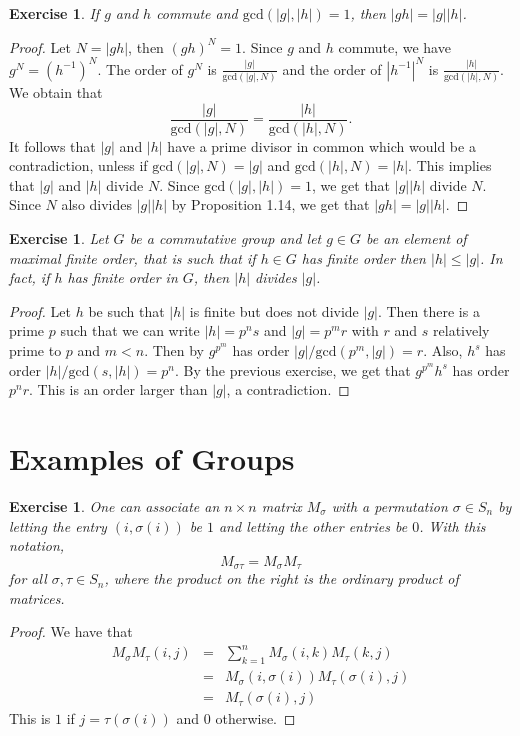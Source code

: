 \documentclass[a4paper, 11pt]{book}
\theoremstyle{plain}
\newtheorem{exercise}[theorem]{Exercise}
\theoremstyle{plain}
\begin{document}
\begin{exercise}
If $g$ and $h$ commute and $\text{gcd}(|g|,|h|)=1$, then $|gh|=|g||h|$.
\end{exercise}
\begin{proof}
Let $N=|gh|$, then $(gh)^N=1$. Since $g$ and $h$ commute, we have $g^N = (h^{-1})^N$. The order of $g^N$ is $\frac{|g|}{\text{gcd}(|g|,N)}$ and the order of $|h^{-1}|^N$ is $\frac{|h|}{\text{gcd}(|h|,N)}$. We obtain that
$$\frac{|g|}{\text{gcd}(|g|,N)}=\frac{|h|}{\text{gcd}(|h|,N)}.$$
It follows that $|g|$ and $|h|$ have a prime divisor in common which would  be a contradiction, unless if $\text{gcd}(|g|,N) = |g|$ and $\text{gcd}(|h|,N) = |h|$. This implies that $|g|$ and $|h|$ divide $N$. Since $\text{gcd}(|g|,|h|)=1$, we get that $|g||h|$ divide $N$. Since $N$ also divides $|g||h|$ by Proposition 1.14, we get that $|gh|= |g||h|$.
\end{proof}

\begin{exercise}
Let $G$ be a commutative group and let $g\in G$ be an element of maximal finite order, that is such that if $h\in G$ has finite order then $|h|\leq |g|$. In fact, if $h$ has finite order in $G$, then $|h|$ divides $|g|$.
\end{exercise}
\begin{proof}
Let $h$ be such that $|h|$ is finite but does not divide $|g|$. Then there is a prime $p$ such that we can write $|h|=p^ns$ and $|g|=p^mr$ with $r$ and $s$ relatively prime to $p$ and $m<n$. Then by $g^{p^m}$ has order $|g|/\text{gcd}(p^m, |g|) = r$. Also, $h^s$ has order $|h|/\text{gcd}(s,|h|) = p^n$. By the previous exercise, we get that $g^{p^m}h^s$ has order $p^nr$. This is an order larger than $|g|$, a contradiction.
\end{proof}

\section{Examples of Groups}
\begin{exercise}
One can associate an $n\times n$ matrix $M_\sigma$ with a permutation $\sigma\in S_n$ by letting the entry $(i, \sigma(i))$ be $1$ and letting the other entries be $0$. With this notation, 
$$M_{\sigma\tau}=M_\sigma M_\tau$$
for all $\sigma,\tau \in S_n$, where the product on the right is the ordinary product of matrices.
\end{exercise}
\begin{proof}
We have that
\begin{eqnarray*}
M_\sigma M_\tau (i,j)
& = & \sum_{k=1}^n M_\sigma (i,k) M_\tau (k,j)\\
& = & M_\sigma(i, \sigma(i))  M_\tau (\sigma(i), j)\\
& = & M_\tau (\sigma(i), j)
\end{eqnarray*}
This is $1$ if $j=\tau(\sigma(i))$ and $0$ otherwise.
\end{proof}
\end{document}
